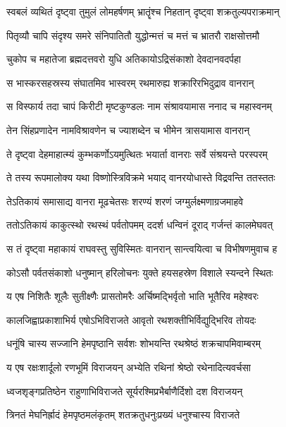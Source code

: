 
\twolineshloka
{स्वबलं व्यथितं दृष्ट्वा तुमुलं लोमहर्षणम्}
{भ्रातॄंश्च निहतान् दृष्ट्वा शक्रतुल्यपराक्रमान्} %

\twolineshloka
{पितृव्यौ चापि संदृश्य समरे संनिपातितौ}
{युद्धोन्मत्तं च मत्तं च भ्रातरौ राक्षसोत्तमौ} %

\twolineshloka
{चुकोप च महातेजा ब्रह्मदत्तवरो युधि}
{अतिकायोऽद्रिसंकाशो देवदानवदर्पहा} %

\twolineshloka
{स भास्करसहस्रस्य संघातमिव भास्वरम्}
{रथमारुह्य शक्रारिरभिदुद्राव वानरान्} %

\twolineshloka
{स विस्फार्य तदा चापं किरीटी मृष्टकुण्डलः}
{नाम संश्रावयामास ननाद च महास्वनम्} %

\twolineshloka
{तेन सिंहप्रणादेन नामविश्रावणेन च}
{ज्याशब्देन च भीमेन त्रासयामास वानरान्} %

\twolineshloka
{ते दृष्ट्वा देहमाहात्म्यं कुम्भकर्णोऽयमुत्थितः}
{भयार्ता वानराः सर्वे संश्रयन्ते परस्परम्} %

\twolineshloka
{ते तस्य रूपमालोक्य यथा विष्णोस्त्रिविक्रमे}
{भयाद् वानरयोधास्ते विद्रवन्ति ततस्ततः} %

\twolineshloka
{तेऽतिकायं समासाद्य वानरा मूढचेतसः}
{शरण्यं शरणं जग्मुर्लक्ष्मणाग्रजमाहवे} %

\twolineshloka
{ततोऽतिकायं काकुत्स्थो रथस्थं पर्वतोपमम्}
{ददर्श धन्विनं दूराद् गर्जन्तं कालमेघवत्} %

\twolineshloka
{स तं दृष्ट्वा महाकायं राघवस्तु सुविस्मितः}
{वानरान् सान्त्वयित्वा च विभीषणमुवाच ह} %

\twolineshloka
{कोऽसौ पर्वतसंकाशो धनुष्मान् हरिलोचनः}
{युक्ते हयसहस्रेण विशाले स्यन्दने स्थितः} %

\twolineshloka
{य एष निशितैः शूलैः सुतीक्ष्णैः प्रासतोमरैः}
{अर्चिष्मद्भिर्वृतो भाति भूतैरिव महेश्वरः} %

\twolineshloka
{कालजिह्वाप्रकाशाभिर्य एषोऽभिविराजते}
{आवृतो रथशक्तीभिर्विद्युद्भिरिव तोयदः} %

\twolineshloka
{धनूंषि चास्य सज्जानि हेमपृष्ठानि सर्वशः}
{शोभयन्ति रथश्रेष्ठं शक्रचापमिवाम्बरम्} %

\twolineshloka
{य एष रक्षःशार्दूलो रणभूमिं विराजयन्}
{अभ्येति रथिनां श्रेष्ठो रथेनादित्यवर्चसा} %

\twolineshloka
{ध्वजशृङ्गप्रतिष्ठेन राहुणाभिविराजते}
{सूर्यरश्मिप्रभैर्बाणैर्दिशो दश विराजयन्} %

\twolineshloka
{त्रिनतं मेघनिर्ह्रादं हेमपृष्ठमलंकृतम्}
{शतक्रतुधनुःप्रख्यं धनुश्चास्य विराजते} %

